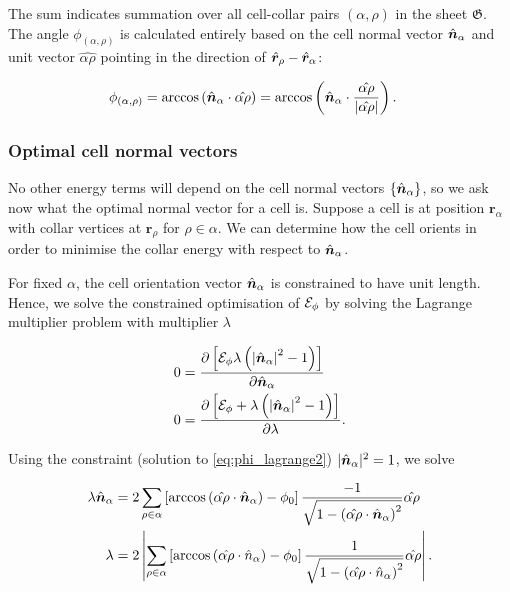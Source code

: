 The sum indicates summation over all cell-collar pairs $(\alpha, \rho)$ in the sheet $\mathfrak{G}$. The angle $\phi_{(\alpha, \rho)}$ is calculated entirely based on the cell normal vector $\hat{\bm{n}}_\alpha$ and unit vector $\hat{\alpha\rho}$ pointing in the direction of $\hat{\bm{r}}_\rho - \hat{\bm{r}}_\alpha$:


\begin{align*}
	\phi_{(\alpha, \rho)} &= \arccos \left(\hat{\bm{n}}_\alpha \cdot \hat{\alpha\rho} \right) = \arccos \left(\hat{\bm{n}}_\alpha \cdot \frac{\hat{\alpha\rho}}{\left| \hat{\alpha\rho}\right|} \right).
\end{align*}

\subsubsection{Optimal cell normal vectors}

No other energy terms will depend on the cell normal vectors $\{ \hat{\bm{n}}_\alpha \}$, so we ask now what the optimal normal vector for a cell is. Suppose a cell is at position $\bm{r}_\alpha$ with collar vertices at $\bm{r}_\rho$ for $\rho \in \alpha$. We can determine how the cell orients in order to minimise the collar energy with respect to $\hat{\bm{n}}_\alpha$. 

For fixed $\alpha$, the cell orientation vector $\hat{\bm{n}}_\alpha$ is constrained to have unit length. Hence, we solve the constrained optimisation of $\mathcal{E}_\phi$ by solving the Lagrange multiplier problem with multiplier $\lambda$

\begin{align}
    0 &= \frac{\partial \left[ \mathcal{E}_\phi \lambda\left( \left| \hat{\bm{n}}_\alpha\right|^2 - 1\right) \right] }{\partial \hat{\bm{n}}_\alpha} \label{eq:phi_lagrange1} \\
    0 &= \frac{\partial \left[ \mathcal{E}_\phi + \lambda\left( \left| \hat{\bm{n}}_\alpha\right|^2 - 1\right)\right] }{\partial \lambda}. \label{eq:phi_lagrange2}
\end{align}

Using the constraint (solution to \cref{eq:phi_lagrange2}) $| \hat{\bm{n}}_\alpha |^2 = 1$, we solve 

\begin{align*} 
    \lambda \hat{\bm{n}}_\alpha &= 2 \sum_{\rho\in\alpha} \left[ \arccos\left(\hat{\alpha\rho} \cdot \hat{\bm{n}}_\alpha \right) - \phi_0 \right] \frac{-1}{\sqrt{1 - \left(\hat{\alpha\rho} \cdot \hat{\bm{n}}_\alpha \right)^2 }} \hat{\alpha\rho} \\
    \lambda &= 2 \left| \sum_{\rho\in\alpha} \left[ \arccos\left(\hat{\alpha\rho} \cdot \hat{n}_\alpha \right) - \phi_0 \right] \frac{1}{\sqrt{1 - \left(\hat{\alpha\rho} \cdot \hat{n}_\alpha \right)^2 }} \hat{\alpha\rho} \right|.  
\end{align*}

